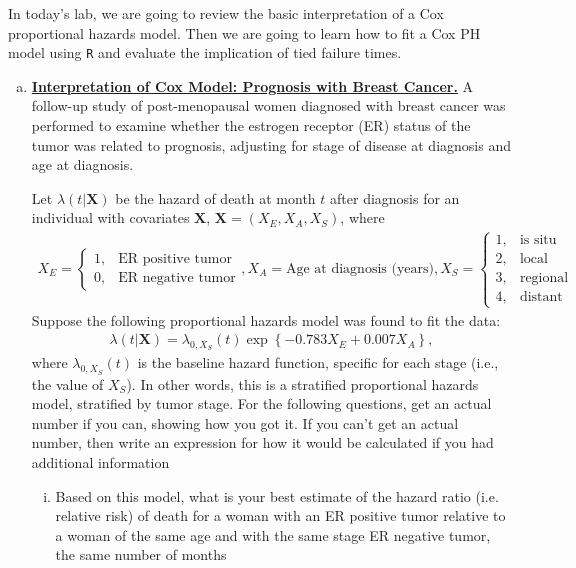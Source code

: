 In today's lab, we are going to review the basic interpretation of a Cox proportional
hazards model. Then we are going to learn how to fit a Cox PH model using \verb|R|
and evaluate the implication of tied failure times.
\begin{enumerate}[(a)]
 \item \textbf{\underline{Interpretation of Cox Model: Prognosis with Breast Cancer.}} A follow-up study of post-menopausal women diagnosed with breast cancer was
performed to examine whether the estrogen receptor (ER) status of the tumor was
related to prognosis, adjusting for stage of disease at diagnosis and age at diagnosis.

Let $\lambda(t|\mathbf{X})$ be the hazard of death at month $t$ after diagnosis for an individual with covariates $\mathbf{X}$, $\mathbf{X} = (X_{E},X_{A},X_{S})$, where
\begin{align}
X_{E} = \begin{cases}
1, & \text{ER positive tumor} \\
0, & \text{ER negative tumor}
\end{cases}
,
X_{A} = \text{Age at diagnosis (years)}
,
X_{S} = \begin{cases}
1, & \text{is situ} \\
2, & \text{local} \\
3, & \text{regional} \\
4, & \text{distant}
\end{cases} \nonumber
\end{align}
Suppose the following proportional hazards model was found to fit the data:
\begin{align}
\lambda(t|\mathbf{X})
 = \lambda_{0,X_{S}}(t)\exp\left\{-0.783X_{E}+0.007X_{A}\right\},\nonumber
\end{align}
where $\lambda_{0,X_{S}}(t)$ is the baseline hazard function, specific for each stage (i.e., the value of $X_{S}$). In other words, this is a stratified proportional hazards model, stratified by tumor stage. For the following questions, get an actual number if you can, showing how you got it. If you can't get
an actual number, then write an expression for how it would be calculated if you had additional
information
\begin{enumerate}[(i)]
\item Based on this model, what is your best estimate of the hazard ratio (i.e. relative
risk) of death for a woman with an ER positive tumor relative to a woman of the
same age and with the same stage ER negative tumor, the same number of months

\end{enumerate}
\end{enumerate}
